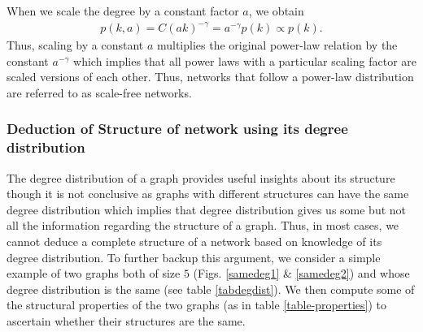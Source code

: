 \documentclass[10pt,a4paper]{article}
\theoremstyle{plain}
\theoremstyle{definition}
\begin{document}
When we scale the degree by a constant factor $a$, we obtain
\begin{eqnarray}
p(k,a) = C(ak)^{-\gamma} = a^{-\gamma} p(k) \propto p(k).
\label{scale}
\end{eqnarray}
Thus, scaling by a constant $a$ multiplies the original power-law relation by the constant $a^{-\gamma}$ which implies that all power laws with a particular scaling factor are scaled versions of each other. Thus, networks that follow a power-law distribution are referred to as scale-free networks.

\subsubsection{Deduction of Structure of network using its degree distribution}
The degree distribution of a graph provides useful insights about its structure though it is not conclusive as 
graphs with different structures can have the same degree distribution which implies that degree distribution gives us some but not all the information regarding the structure
of a graph. Thus, in most cases, we cannot deduce a complete structure of a network based on knowledge of
its degree distribution. To further backup this argument, we consider a simple example of two graphs both of size $5$ (Figs. \ref{samedeg1} \& \ref{samedeg2}) and whose degree distribution is the same (see table \ref{tabdegdist}). We then compute some of the structural properties of the two graphs (as in table \ref{table-properties}) to ascertain whether their structures are the same.
\end{document}
